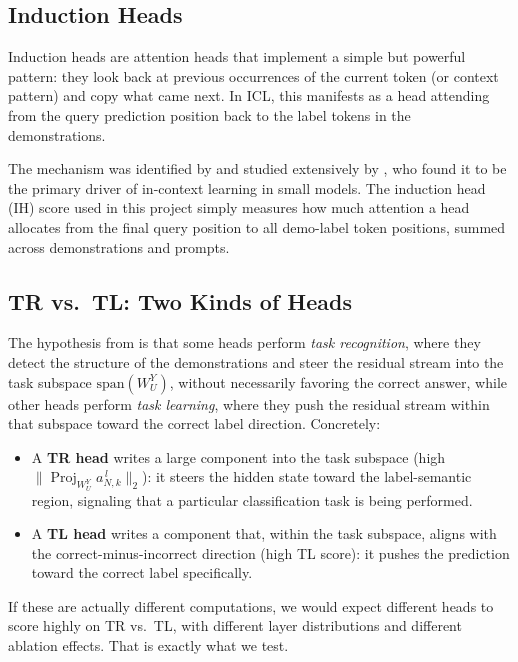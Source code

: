 \documentclass[twoside,english]{article}
\begin{document}
\subsection{Induction Heads}

Induction heads are attention heads that implement a simple but powerful pattern: they look back at previous occurrences of the current token (or context pattern) and copy what came next. In ICL, this manifests as a head attending from the query prediction position back to the label tokens in the demonstrations.

The mechanism was identified by \cite{TransformerCircuits} and studied extensively by \cite{InductionHeads}, who found it to be the primary driver of in-context learning in small models. The induction head (IH) score used in this project simply measures how much attention a head allocates from the final query position to all demo-label token positions, summed across demonstrations and prompts.

\subsection{TR vs.\ TL: Two Kinds of Heads}

The hypothesis from \cite{TSLA} is that some heads perform \textit{task recognition}, where they detect the structure of the demonstrations and steer the residual stream into the task subspace $\mathrm{span}(W_U^Y)$, without necessarily favoring the correct answer, while other heads perform \textit{task learning}, where they push the residual stream within that subspace toward the correct label direction. Concretely:

\begin{itemize}
    \item A \textbf{TR head} writes a large component into the task subspace (high $\|\operatorname{Proj}_{W_U^Y} a_{N,k}^{\,l}\|_2$): it steers the hidden state toward the label-semantic region, signaling that a particular classification task is being performed.
    \item A \textbf{TL head} writes a component that, within the task subspace, aligns with the correct-minus-incorrect direction (high TL score): it pushes the prediction toward the correct label specifically.
\end{itemize}

If these are actually different computations, we would expect different heads to score highly on TR vs.\ TL, with different layer distributions and different ablation effects. That is exactly what we test.
\end{document}
